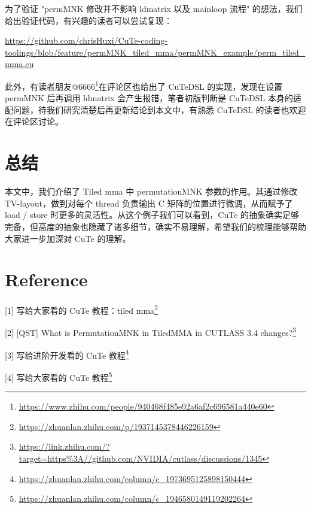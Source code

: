 为了验证 "permMNK 修改并不影响 ldmatrix 以及 mainloop 流程" 的想法，我们给出验证代码，有兴趣的读者可以尝试复现：

\url{https://github.com/chrisHuxi/CuTe-coding-toolings/blob/feature/permMNK_tiled_mma/permMNK_example/perm_tiled_mma.cu}

此外，有读者朋友@6666\footnote{\url{https://www.zhihu.com/people/940468f485e92a6af2c696581a440e60}}在评论区也给出了 CuTeDSL 的实现，发现在设置 permMNK 后再调用 ldmatrix 会产生报错，笔者初版判断是 CuTeDSL 本身的适配问题，待我们研究清楚后再更新结论到本文中，有熟悉 CuTeDSL 的读者也欢迎在评论区讨论。

\section{总结}

本文中，我们介绍了 Tiled mma 中 permutationMNK 参数的作用。其通过修改 TV-layout，做到对每个 thread 负责输出 C 矩阵的位置进行微调，从而赋予了 load / store 时更多的灵活性。从这个例子我们可以看到，CuTe 的抽象确实足够完备，但高度的抽象也隐藏了诸多细节，确实不易理解，希望我们的梳理能够帮助大家进一步加深对 CuTe 的理解。

\section{Reference}

[1] 写给大家看的 CuTe 教程：tiled mma\footnote{\url{https://zhuanlan.zhihu.com/p/1937145378446226159}}

[2] [QST] What is PermutationMNK in TiledMMA in CUTLASS 3.4 changes?\footnote{\url{https://link.zhihu.com/?target=https\%3A//github.com/NVIDIA/cutlass/discussions/1345}}

[3] 写给进阶开发看的 CuTe 教程\footnote{\url{https://zhuanlan.zhihu.com/column/c_1973695125898150444}}

[4] 写给大家看的 CuTe 教程\footnote{\url{https://zhuanlan.zhihu.com/column/c_1946580149119202264}}
